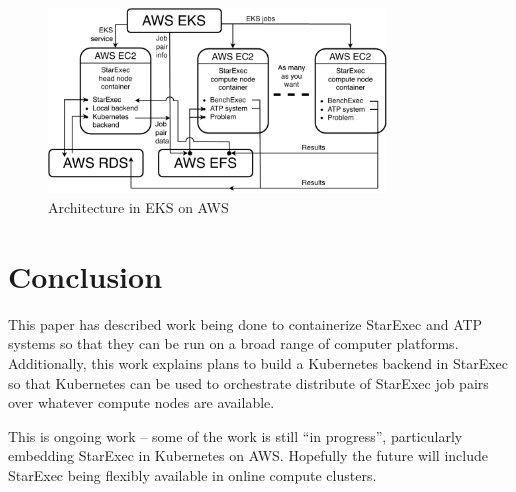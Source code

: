 \documentclass{easychair}
\begin{document}
\begin{figure}[htb]
\begin{center}
\includegraphics[width=0.8\textwidth]{ArchitectureAWS}
\caption{Architecture in EKS on AWS}
\label{ArchitectureAWS}
\end{center}
\end{figure}

\section{Conclusion}
\label{Conclusion}

This paper has described work being done to containerize StarExec and ATP systems so that they 
can be run on a broad range of computer platforms.
Additionally, this work explains plans to build a Kubernetes backend in StarExec so that 
Kubernetes can be used to orchestrate distribute of StarExec job pairs over whatever compute 
nodes are available.

This is ongoing work -- some of the work is still ``in progress'', particularly embedding
StarExec in Kubernetes on AWS.
Hopefully the future will include StarExec being flexibly available in online compute clusters.



\appendix

\newpage
\end{document}
